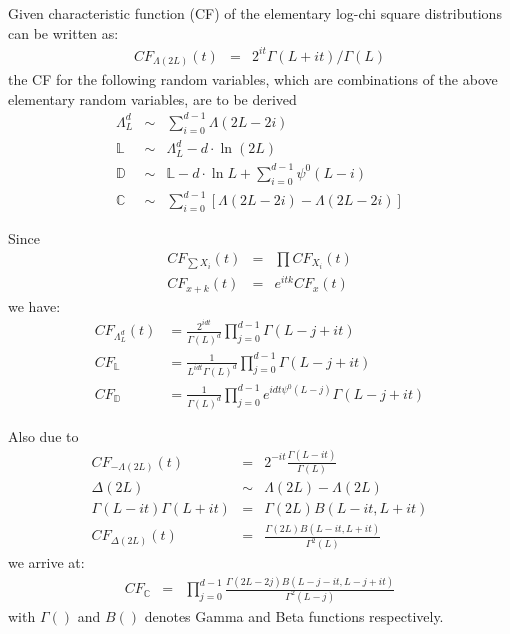 \documentclass[journal]{IEEEtran}
\begin{document}
Given characteristic function (CF) of the elementary log-chi square distributions can be written as:
\begin{eqnarray}
 CF_{\Lambda(2L)}(t) &=& 2^{it}\Gamma(L+it)/\Gamma(L) \nonumber
\end{eqnarray}
  the CF for the following random variables,
  which are combinations of the above elementary random variables, are to be derived
\begin{eqnarray*}
   \Lambda^d_L &\sim&  \sum^{d-1}_{i=0} \Lambda(2L-2i) \\
  \mathbb{L} &\sim&  \Lambda^d_L -d \cdot \ln(2L) \\
  \mathbb{D} &\sim& \mathbb{L} - d \cdot \ln{L} + \sum^{d-1}_{i=0} \psi^0(L-i) \\
  \mathbb{C} &\sim&  \sum^{d-1}_{i=0} \left[ \Lambda(2L-2i) - \Lambda(2L-2i) \right]
\end{eqnarray*}

Since
\begin{eqnarray*}
 CF_{\sum X_i}(t)   &=& \prod CF_{X_i}(t) \\
 CF_{x+k}(t) &=& e^{itk}CF_x(t)
\end{eqnarray*}
we have:
\begin{align}
  CF_{\Lambda^d_L}(t) &= \frac{2^{idt}}{\Gamma(L)^d} \prod^{d-1}_{j=0} \Gamma(L-j+it) \\
   CF_{\mathbb{L}} &= \frac{1}{L^{idt} \Gamma(L)^d}  \prod^{d-1}_{j=0} \Gamma(L-j+it) \\
   CF_{\mathbb{D}} &= \frac{ 1 }{\Gamma(L)^d} \prod^{d-1}_{j=0} e^{idt \psi^0(L-j)} \Gamma(L-j+it)  
\end{align}

Also due to
\begin{eqnarray*}
  CF_{-\Lambda(2L)}(t) &=& 2^{-it}\frac{\Gamma(L-it)}{\Gamma(L)} \\ 
  \Delta(2L) &\sim& \Lambda(2L) - \Lambda(2L) \\
  \Gamma(L-it) \Gamma(L+it) &=&  \Gamma(2L)B(L-it,L+it) \\
   CF_{\Delta(2L)}(t) &=& \frac{\Gamma(2L)B(L-it,L+it)}{\Gamma^2(L)} 
\end{eqnarray*}
we arrive at:
\begin{align}
  CF_{\mathbb{C}} &=&  \prod^{d-1}_{j=0} \frac{\Gamma(2L-2j)B(L-j-it,L-j+it)}{\Gamma^2(L-j)} 
\end{align}
with $\Gamma()$ and $B()$ denotes Gamma and Beta functions respectively.
\end{document}
